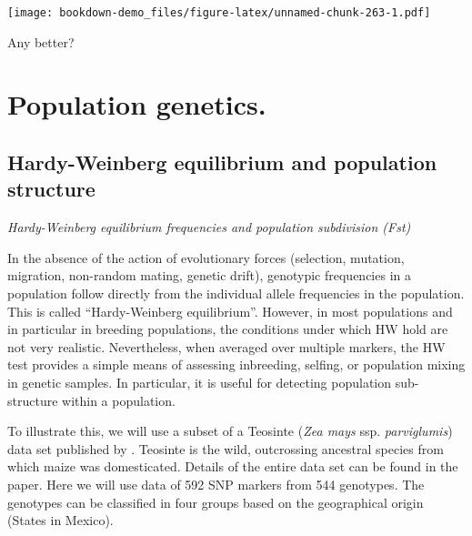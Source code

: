 \documentclass[
]{book}
\newenvironment{Shaded}{\begin{snugshade}}{\end{snugshade}}
\newcommand{\AttributeTok}[1]{\textcolor[rgb]{0.77,0.63,0.00}{#1}}
\newcommand{\DecValTok}[1]{\textcolor[rgb]{0.00,0.00,0.81}{#1}}
\newcommand{\FloatTok}[1]{\textcolor[rgb]{0.00,0.00,0.81}{#1}}
\newcommand{\FunctionTok}[1]{\textcolor[rgb]{0.00,0.00,0.00}{#1}}
\newcommand{\NormalTok}[1]{#1}
\newcommand{\SpecialCharTok}[1]{\textcolor[rgb]{0.00,0.00,0.00}{#1}}
\newcommand{\StringTok}[1]{\textcolor[rgb]{0.31,0.60,0.02}{#1}}
\begin{document}
\begin{Shaded}
\end{Shaded}

\texttt{[image: bookdown-demo\_files/figure-latex/unnamed-chunk-263-1.pdf]}

Any better?

\hypertarget{Population-genetics}{%
\chapter{Population genetics.}\label{Population-genetics}}

\hypertarget{hardy-weinberg-equilibrium-and-population-structure}{%
\section{Hardy-Weinberg equilibrium and population structure}\label{hardy-weinberg-equilibrium-and-population-structure}}

\emph{Hardy-Weinberg equilibrium frequencies and population subdivision (Fst)}

In the absence of the action of evolutionary forces (selection, mutation, migration, non-random mating, genetic drift), genotypic frequencies in a population follow directly from the individual allele frequencies in the population. This is called ``Hardy-Weinberg equilibrium''. However, in most populations and in particular in breeding populations, the conditions under which HW hold are not very realistic. Nevertheless, when averaged over multiple markers, the HW test provides a simple means of assessing inbreeding, selfing, or population mixing in genetic samples. In particular, it is useful for detecting population sub-structure within a population.

To illustrate this, we will use a subset of a Teosinte (\emph{Zea mays} ssp. \emph{parviglumis}) data set published by \citet{weber_major_2007}. Teosinte is the wild, outcrossing ancestral species from which maize was domesticated. Details of the entire data set can be found in the paper. Here we will use data of 592 SNP markers from 544 genotypes. The genotypes can be classified in four groups based on the geographical origin (States in Mexico).
\end{document}
